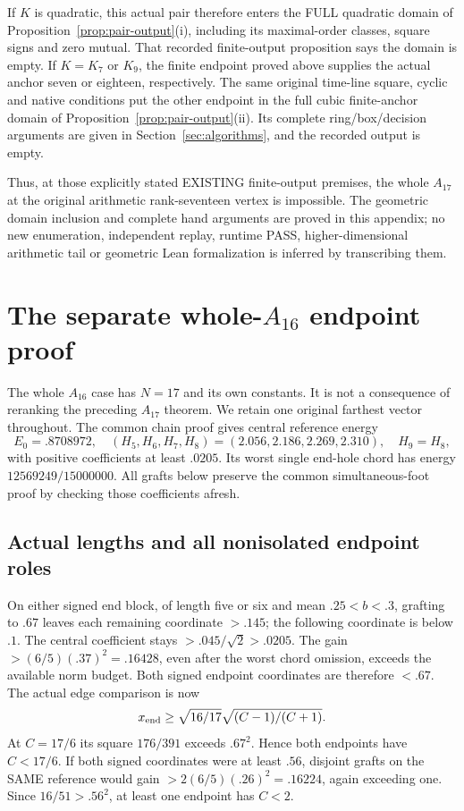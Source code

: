 \documentclass[11pt]{article}
\begin{document}
If \(K\) is quadratic, this actual pair therefore enters the FULL
quadratic domain of Proposition~\ref{prop:pair-output}(i),
including its maximal-order classes, square signs and zero mutual.
That recorded finite-output proposition says the domain is empty.
If \(K=K_7\) or \(K_9\), the finite endpoint proved above supplies
the actual anchor seven or eighteen, respectively.
The same original time-line square, cyclic and native conditions
put the other endpoint in the full cubic finite-anchor domain
of Proposition~\ref{prop:pair-output}(ii).
Its complete ring/box/decision arguments are given in
Section~\ref{sec:algorithms}, and the recorded output is empty.

Thus, at those explicitly stated EXISTING finite-output premises,
the whole \(A_{17}\) at the original arithmetic rank-seventeen
vertex is impossible.
The geometric domain inclusion and complete hand arguments are
proved in this appendix; no new enumeration, independent replay,
runtime PASS, higher-dimensional arithmetic tail or geometric
Lean formalization is inferred by transcribing them.

\section{The separate whole-\(A_{16}\) endpoint proof}
\label{app:wholearithA16}

The whole \(A_{16}\) case has \(N=17\) and its own constants.
It is not a consequence of reranking the preceding \(A_{17}\)
theorem.  We retain one original farthest vector throughout.
The common chain proof gives central reference energy
\[
 E_0=.8708972,\quad
 (H_5,H_6,H_7,H_8)=(2.056,2.186,2.269,2.310),\quad H_9=H_8,
\]
with positive coefficients at least \(.0205\).
Its worst single end-hole chord has energy
\(12569249/15000000\).
All grafts below preserve the common simultaneous-foot proof
by checking those coefficients afresh.

\subsection{Actual lengths and all nonisolated endpoint roles}
\label{app:arithA16endpointlist}

On either signed end block, of length five or six and mean
\(.25<b<.3\), grafting to \(.67\) leaves each remaining
coordinate \(>.145\); the following coordinate is below \(.1\).
The central coefficient stays \(>.045/\sqrt2>.0205\).
The gain \(>(6/5)(.37)^2=.16428\), even after the worst
chord omission, exceeds the available norm budget.
Both signed endpoint coordinates are therefore \(<.67\).
The actual edge comparison is now
\[
 x_{\rm end}\ge\sqrt{16/17}\sqrt{(C-1)/(C+1)}.
\]
At \(C=17/6\) its square \(176/391\) exceeds \(.67^2\).
Hence both endpoints have \(C<17/6\).
If both signed coordinates were at least \(.56\), disjoint
grafts on the SAME reference would gain
\(>2(6/5)(.26)^2=.16224\), again exceeding one.
Since \(16/51>.56^2\), at least one endpoint has \(C<2\).
\end{document}
